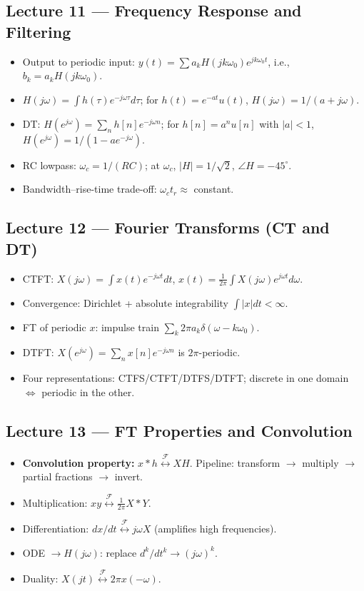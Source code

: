 \documentclass[11pt]{article}
\newcommand{\FT}{\overset{\mathcal{F}}{\longleftrightarrow}}
\begin{document}
\subsection{Lecture 11 --- Frequency Response and Filtering}
\begin{itemize}[leftmargin=*]
  \item Output to periodic input: $y(t) = \sum a_k H(jk\omega_0) e^{jk\omega_0 t}$, i.e., $b_k = a_k H(jk\omega_0)$.
  \item $H(j\omega)=\int h(\tau)e^{-j\omega\tau}d\tau$; for $h(t)=e^{-at}u(t)$, $H(j\omega)=1/(a+j\omega)$.
  \item DT: $H(e^{j\omega})=\sum_n h[n]e^{-j\omega n}$; for $h[n]=a^n u[n]$ with $|a|<1$, $H(e^{j\omega})=1/(1-ae^{-j\omega})$.
  \item RC lowpass: $\omega_c = 1/(RC)$; at $\omega_c$, $|H|=1/\sqrt{2}$, $\angle H=-45^\circ$.
  \item Bandwidth--rise-time trade-off: $\omega_c t_r \approx $ constant.
\end{itemize}

\subsection{Lecture 12 --- Fourier Transforms (CT and DT)}
\begin{itemize}[leftmargin=*]
  \item CTFT: $X(j\omega)=\int x(t)e^{-j\omega t}dt$, $x(t) = \frac{1}{2\pi}\int X(j\omega)e^{j\omega t}d\omega$.
  \item Convergence: Dirichlet + absolute integrability $\int|x|dt<\infty$.
  \item FT of periodic $x$: impulse train $\sum_k 2\pi a_k \delta(\omega-k\omega_0)$.
  \item DTFT: $X(e^{j\omega})=\sum_n x[n]e^{-j\omega n}$ is $2\pi$-periodic.
  \item Four representations: CTFS/CTFT/DTFS/DTFT; discrete in one domain $\Leftrightarrow$ periodic in the other.
\end{itemize}

\subsection{Lecture 13 --- FT Properties and Convolution}
\begin{itemize}[leftmargin=*]
  \item \textbf{Convolution property:} $x*h \FT XH$. Pipeline: transform $\to$ multiply $\to$ partial fractions $\to$ invert.
  \item Multiplication: $xy \FT \frac{1}{2\pi} X*Y$.
  \item Differentiation: $dx/dt \FT j\omega X$ (amplifies high frequencies).
  \item ODE $\to H(j\omega)$: replace $d^k/dt^k \to (j\omega)^k$.
  \item Duality: $X(jt) \FT 2\pi x(-\omega)$.
\end{itemize}
\end{document}
